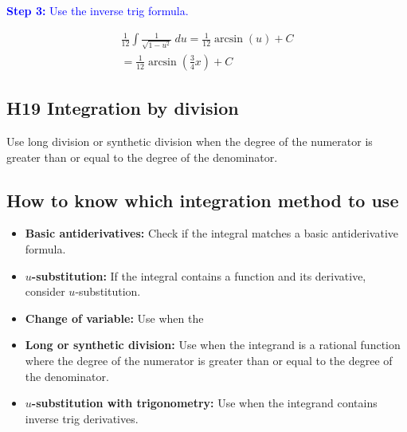 \documentclass[letterpaper, 12pt]{article}
\newcommand{\step}[2]{\textcolor{blue}{\textbf{Step #1:} #2}}
\begin{document}
\step{3}{Use the inverse trig formula.}

\begin{gather*}
\frac{1}{12} \int \frac{1}{\sqrt{1 - u^2}} \: du = \frac{1}{12} \arcsin(u) + C \\
= \boxed{\frac{1}{12} \arcsin\left(\frac{3}{4}x\right) + C}
\end{gather*}

\subsection*{H19 Integration by division}

Use long division or synthetic division when the degree of the numerator is greater than or equal to the degree of the denominator.

\subsection*{How to know which integration method to use}

\begin{itemize}
    \item \textbf{Basic antiderivatives:} Check if the integral matches a basic antiderivative formula.
    \item \textbf{$u$-substitution:} If the integral contains a function and its derivative, consider $u$-substitution.
    \item \textbf{Change of variable:} Use when the 
    \item \textbf{Long or synthetic division:} Use when the integrand is a rational function where the degree of the numerator is greater than or equal to the degree of the denominator.
    \item \textbf{$u$-substitution with trigonometry:} Use when the integrand contains inverse trig derivatives.
\end{itemize}
    
\end{document}
